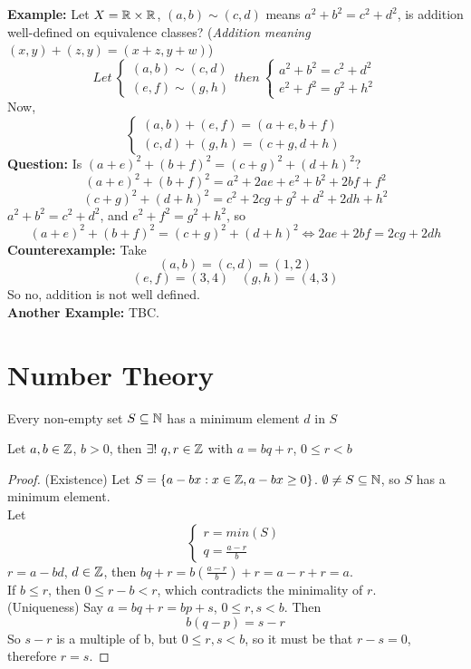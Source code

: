 \documentclass[openany]{report}
\begin{document}
\textbf{Example: } Let $X = \mathbb{R} \times \mathbb{R}$, $(a,b) \sim (c,d)$ means $a^2 + b^2 = c^2 + d^2$, is addition well-defined on equivalence classes? (\textit{Addition meaning $(x,y) + (z,y) = (x + z, y+w)$})\\
\[
Let \ 
\begin{cases}
(a,b) \sim (c,d)\\
(e,f) \sim (g,h)
\end{cases}
then \ 
\begin{cases}
    a^2 + b^2 = c^2 + d^2\\
    e^2 + f^2 = g^2 + h^2
\end{cases}
\]
Now,
\[
\begin{cases}
    (a,b) + (e,f) = (a + e, b+f)\\
    (c,d) + (g,h) = (c+g, d+h)
\end{cases}
\]
\textbf{Question:} Is $(a+e)^2 + (b+f)^2 = (c+g)^2 + (d+h)^2$?
$$(a+e)^2 + (b+f)^2 = a^2 + 2ae + e^2 + b^2 + 2bf + f^2$$
$$(c+g)^2 + (d+h)^2 = c^2 + 2cg + g^2 + d^2 + 2dh + h^2$$
$a^2 + b^2 = c^2 + d^2$, and $e^2 + f^2 = g^2 + h^2$, so 
$$(a+e)^2 + (b+f)^2 = (c+g)^2 + (d+h)^2 \iff 2ae + 2bf = 2cg + 2dh$$
\textbf{Counterexample:} Take 
$$(a,b) = (c,d) = (1,2)$$
$$(e,f) = (3,4) \ \ \ \ (g,h) = (4,3)$$
So no, addition is not well defined. \\[3ex]
\noindent
\textbf{Another Example: } TBC.

\section{Number Theory}
\begin{fact}
Every non-empty set $S \subseteq \mathbb{N}$ has a minimum element $d$ in $S$
\end{fact}
\begin{prop}
Let $a,b \in \mathbb{Z}$, $b > 0$, then $\exists ! \ q,r \in \mathbb{Z}$ with $a = bq + r$, $0 \leq r < b$
\end{prop}
\begin{proof}
    (Existence) Let $S = \{a - bx: x \in \mathbb{Z}, a-bx \geq 0 \}$. 
    $\emptyset \neq S \subseteq \mathbb{N}$, so $S$ has a minimum element.\\
    Let \[\begin{cases}
        r = min(S)\\
        q = \frac{a-r}{b}
    \end{cases}\]
    $r = a - bd$, $d \in \mathbb{Z}$, then $bq +r = b(\frac{a-r}{b}) + r = a - r + r = a$.\\[1ex]
    If $b \leq r$, then $0 \leq r - b < r$, which contradicts the minimality of $r$.\\[2ex]
    (Uniqueness) Say $a = bq + r = bp + s$, $0 \leq r,s < b$. Then
    $$b(q-p) = s - r$$
    So $s-r$ is a multiple of b, but $0 \leq r,s < b$, so it must be that $r - s = 0$, therefore $r = s$.
\end{proof}
\end{document}

